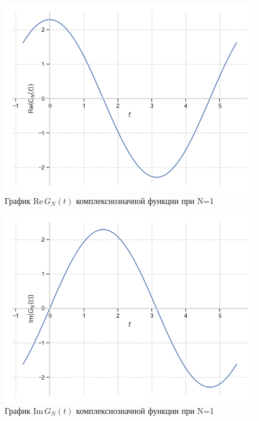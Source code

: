 \documentclass[a4paper, 16pt]{article}
\begin{document}
\newpage
\vspace*{10mm}
\begin{figure}[!htb]
    \centering
    \includegraphics[scale=0.8]{fourier_re_cfunc_n=1.png}
    \captionsetup{skip=0pt}
    \caption{График Re$\,G_N(t)$ комплекснозначной функции при N=1}
    \label{Рис:42}
\end{figure}
\begin{figure}[!htb]
    \centering
    \includegraphics[scale=0.8]{fourier_im_cfunc_n=1.png}
    \captionsetup{skip=0pt}
    \caption{График Im$\,G_N(t)$ комплекснозначной функции при N=1}
    \label{Рис:43}
\end{figure}
\newpage
\vspace*{10mm}
\end{document}
